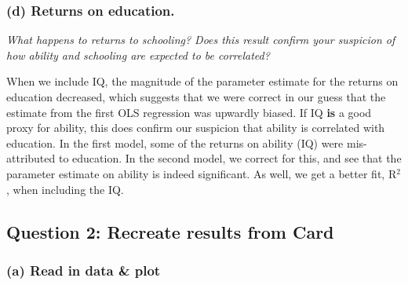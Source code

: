 \documentclass[11pt,]{article}
\newenvironment{Shaded}{\begin{snugshade}}{\end{snugshade}}
\newcommand{\KeywordTok}[1]{\textcolor[rgb]{0.13,0.29,0.53}{\textbf{#1}}}
\newcommand{\StringTok}[1]{\textcolor[rgb]{0.31,0.60,0.02}{#1}}
\newcommand{\CommentTok}[1]{\textcolor[rgb]{0.56,0.35,0.01}{\textit{#1}}}
\newcommand{\OperatorTok}[1]{\textcolor[rgb]{0.81,0.36,0.00}{\textbf{#1}}}
\newcommand{\NormalTok}[1]{#1}
\begin{document}
\subsubsection{(d) Returns on education.}\label{d-returns-on-education.}

\emph{What happens to returns to schooling? Does this result confirm
your suspicion of how ability and schooling are expected to be
correlated?}

When we include IQ, the magnitude of the parameter estimate for the
returns on education decreased, which suggests that we were correct in
our guess that the estimate from the first OLS regression was upwardly
biased. If IQ \textbf{is} a good proxy for ability, this does confirm
our suspicion that ability is correlated with education. In the first
model, some of the returns on ability (IQ) were mis-attributed to
education. In the second model, we correct for this, and see that the
parameter estimate on ability is indeed significant. As well, we get a
better fit, R\(^2\), when including the IQ.

\subsection{Question 2: Recreate results from
Card}\label{question-2-recreate-results-from-card}

\subsubsection{(a) Read in data \& plot}\label{a-read-in-data-plot}

\begin{Shaded}
\end{Shaded}
\end{document}
